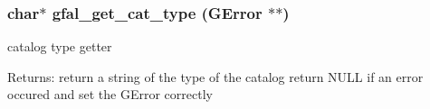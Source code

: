 \subsubsection{\setlength{\rightskip}{0pt plus 5cm}char$\ast$ gfal\_\-get\_\-cat\_\-type (GError $\ast$$\ast$)}\label{gfal__common__catalog_8c_c20aa1a376c802d0c60208854537851e}


catalog type getter 

\begin{Desc}
\item[Returns:]return a string of the type of the catalog return NULL if an error occured and set the GError correctly \end{Desc}

